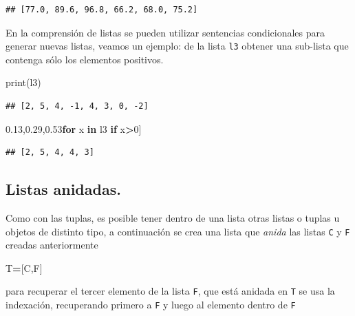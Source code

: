 \documentclass[
]{book}
\newenvironment{Shaded}{\begin{snugshade}}{\end{snugshade}}
\newcommand{\BuiltInTok}[1]{#1}
\newcommand{\ControlFlowTok}[1]{\textcolor[rgb]{0.13,0.29,0.53}{\textbf{#1}}}
\newcommand{\DecValTok}[1]{\textcolor[rgb]{0.00,0.00,0.81}{#1}}
\newcommand{\KeywordTok}[1]{\textcolor[rgb]{0.13,0.29,0.53}{\textbf{#1}}}
\newcommand{\NormalTok}[1]{#1}
\newcommand{\OperatorTok}[1]{\textcolor[rgb]{0.81,0.36,0.00}{\textbf{#1}}}
\theoremstyle{definition}
\theoremstyle{definition}
\theoremstyle{definition}
\theoremstyle{definition}
\theoremstyle{remark}
\begin{document}
\begin{verbatim}
## [77.0, 89.6, 96.8, 66.2, 68.0, 75.2]
\end{verbatim}

En la comprensión de listas se pueden utilizar sentencias condicionales para generar nuevas listas, veamos un ejemplo: de la lista \texttt{l3} obtener una sub-lista que contenga sólo los elementos positivos.

\begin{Shaded}
\begin{Highlighting}[]
\BuiltInTok{print}\NormalTok{(l3) }
\end{Highlighting}
\end{Shaded}

\begin{verbatim}
## [2, 5, 4, -1, 4, 3, 0, -2]
\end{verbatim}

\begin{Shaded}
\begin{Highlighting}[]
\NormalTok{[x }\ControlFlowTok{for}\NormalTok{ x }\KeywordTok{in}\NormalTok{ l3 }\ControlFlowTok{if}\NormalTok{ x}\OperatorTok{\textgreater{}}\DecValTok{0}\NormalTok{]}
\end{Highlighting}
\end{Shaded}

\begin{verbatim}
## [2, 5, 4, 4, 3]
\end{verbatim}

\hypertarget{listas-anidadas.}{%
\subsection{Listas anidadas.}\label{listas-anidadas.}}

Como con las tuplas, es posible tener dentro de una lista otras listas o tuplas u objetos de distinto tipo, a continuación se crea una lista que \emph{anida} las listas \texttt{C} y \texttt{F} creadas anteriormente

\begin{Shaded}
\begin{Highlighting}[]
\NormalTok{T}\OperatorTok{=}\NormalTok{[C,F]}
\end{Highlighting}
\end{Shaded}

para recuperar el tercer elemento de la lista \texttt{F}, que está anidada en \texttt{T} se usa la indexación, recuperando primero a \texttt{F} y luego al elemento dentro de \texttt{F}
\end{document}
